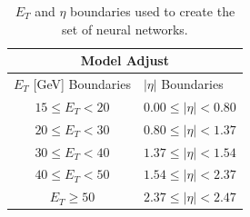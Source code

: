

\begin{table}[htb]
\begin{center}
	{\small
	\begin{tabular}{cccc}
		\hline \hline
		\multicolumn{4}{c}{Model Adjust}                                                                 \\ \hline
		\multicolumn{2}{c|}{$E_T$ {[}GeV{]} Boundaries} & \multicolumn{2}{l}{$|\eta|$ Boundaries}        \\ \hline
		\multicolumn{2}{c|}{$15 \leq E_T < 20 $}        & \multicolumn{2}{l}{$0.00 \leq |\eta| < 0.80 $}   \\
		\multicolumn{2}{c|}{$20 \leq E_T < 30 $}        & \multicolumn{2}{l}{$0.80 \leq |\eta| < 1.37 $}  \\
		\multicolumn{2}{c|}{$30 \leq E_T < 40 $}        & \multicolumn{2}{l}{$1.37 \leq |\eta| < 1.54 $} \\
		\multicolumn{2}{c|}{$40 \leq E_T < 50 $}        & \multicolumn{2}{l}{$1.54 \leq |\eta| < 2.37 $} \\
		\multicolumn{2}{c|}{$E_T \geq 50 $}    & \multicolumn{2}{l}{$2.37 \leq |\eta| < 2.47 $} \\ \hline \hline
	\end{tabular}
}
\end{center}
\caption{$E_T$ and $\eta$ boundaries used to create the set of neural networks.}
\label{tab:ensemble_regions}
\end{table}